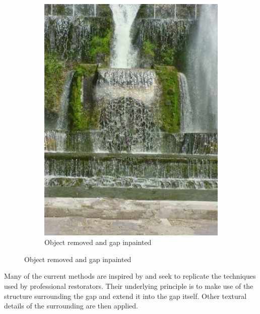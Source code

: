 \documentclass[11pt,oneside]{book}
\theoremstyle{plain}
\theoremstyle{definition}
\theoremstyle{remark}
\begin{document}
\begin{figure}[H]
\begin{subfigure}[b]{0.49\textwidth}
    \includegraphics[width=\textwidth]{researchmicros-001.jpg}
    \caption{Object removed and gap inpainted}
  \end{subfigure}
  \label{fig:inpaint_ex}
\end{figure}

Many of the current methods are inspired by and seek to replicate the techniques used by 
professional restorators. Their underlying principle is to make use of the structure
surrounding the gap and extend it into the gap itself. Other textural details of the
surrounding are then applied.  
\end{document}
